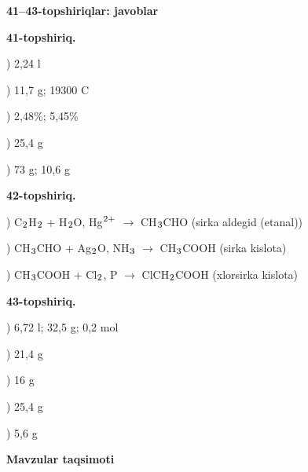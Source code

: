 \documentclass[11pt,a4paper]{article}
\renewcommand{\textsubscript}[1]{\ensuremath{_{\text{\fontsize{8}{8}\selectfont #1}}}}
\renewcommand{\textsuperscript}[1]{\ensuremath{^{\text{\fontsize{8}{8}\selectfont #1}}}}
\begin{document}
\noindent\textbf{41--43-topshiriqlar: javoblar}\par\smallskip
\noindent\textbf{41-topshiriq.}\par
{}) 2,24 l\par
{}) 11,7 g; 19300 C\par
{}) 2,48\%; 5,45\%\par
{}) 25,4 g\par
{}) 73 g; 10,6 g\par
\noindent\textbf{42-topshiriq.}\par
{}) C\textsubscript{2}H\textsubscript{2} + H\textsubscript{2}O, Hg\textsuperscript{2+} $\to$ CH\textsubscript{3}CHO (sirka aldegid (etanal))\par
{}) CH\textsubscript{3}CHO + Ag\textsubscript{2}O, NH\textsubscript{3} $\to$ CH\textsubscript{3}COOH (sirka kislota)\par
{}) CH\textsubscript{3}COOH + Cl\textsubscript{2}, P $\to$ ClCH\textsubscript{2}COOH (xlorsirka kislota)\par
\noindent\textbf{43-topshiriq.}\par
{}) 6,72 l; 32,5 g; 0,2 mol\par
{}) 21,4 g\par
{}) 16 g\par
{}) 25,4 g\par
{}) 5,6 g\par
\par\bigskip\noindent\textbf{Mavzular taqsimoti}\par\smallskip
\end{document}
